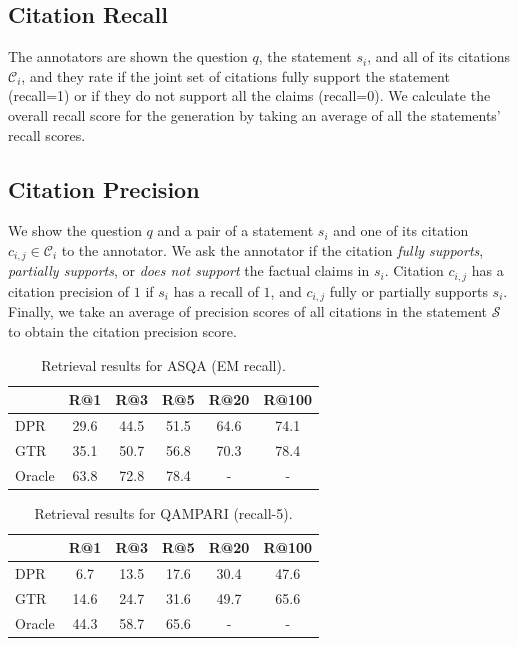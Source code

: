 \documentclass[11pt]{article}
\begin{document}
\subsection{Citation Recall}
The annotators are shown the question $q$, the statement $s_i$, and all of its citations $\mathcal{C}_i$, and they rate if the joint set of citations fully support the statement (recall=1) or if they do not support all the claims (recall=0).
We  calculate the overall recall score
for the generation by taking an average of all the statements' recall scores.

\subsection{Citation Precision}
We show the question $q$ and a pair of a statement $s_i$ and one of its citation $c_{i,j} \in \mathcal{C}_i$
to the annotator.
We ask the annotator if the citation  \textit{fully supports}, \textit{partially supports}, or \textit{does not support} the factual claims in $s_i$.
Citation $c_{i,j}$ has a citation precision of $1$ if $s_i$ has a recall of $1$, and
$c_{i,j}$ fully or partially supports $s_i$.
Finally, we take an average of  precision scores of all citations in the statement $\mathcal{S}$ to obtain the citation  precision score.




\begin{table}[t]
    \centering
    \small
    \begin{tabular}{@{}lccccc@{}}
    \toprule
     & R@1 & R@3 & R@5 & R@20 & R@100 \\ \midrule
    DPR & 29.6 & 44.5 & 51.5 & 64.6 & 74.1 \\
    GTR & 35.1 & 50.7 & 56.8 & {70.3} & {78.4} \\
    Oracle & 63.8 & 72.8 & 78.4 & - & - \\
    \bottomrule
    \end{tabular}
    \caption{Retrieval results for ASQA (EM recall).}
    \label{tab:retrieval-asqa}
\end{table}


\begin{table}[t]
    \centering
    \small
    \begin{tabular}{@{}lccccc@{}}
    \toprule
     & R@1 & R@3 & R@5 & R@20 & R@100 \\ \midrule
    DPR & 6.7 & 13.5 & 17.6 & 30.4 & 47.6 \\
    GTR & 14.6 & 24.7 & 31.6 & 49.7 & {65.6} \\
    Oracle & 44.3 & 58.7 & 65.6 & - & - \\
    \bottomrule
    \end{tabular}
    \caption{Retrieval results for QAMPARI (recall-5).}
    \label{tab:retrieval-qampari}
\end{table}
\end{document}
